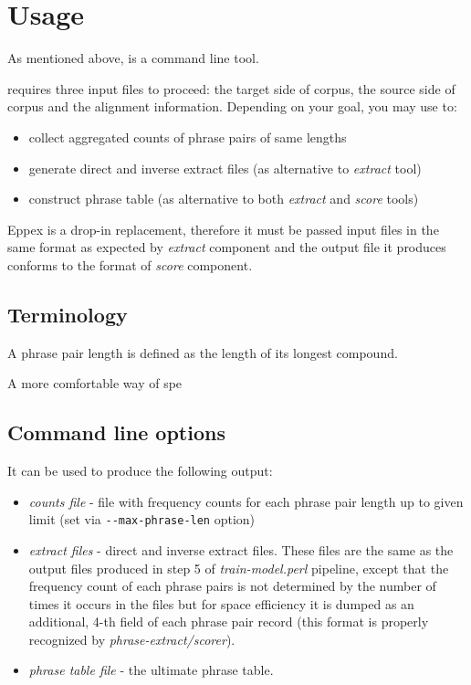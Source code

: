 

\section{Usage}

As mentioned above, \eppex{} is a command line tool.

\Eppex{} requires three input files to proceed:
the target side of corpus, the source side of corpus and the alignment information.
Depending on your goal, you may use \eppex{} to:
\begin{itemize}
 \item collect aggregated counts of phrase pairs of same lengths
 \item generate direct and inverse extract files (as alternative to \emph{extract} tool)
 \item construct phrase table (as alternative to both \emph{extract} and \emph{score} tools)
\end{itemize}

Eppex is a drop-in replacement, therefore it must be passed input files
in the same format as expected by \emph{extract} component and
the output file it produces conforms to the format of \emph{score} component.

\subsection{Terminology}


A phrase pair length is defined as the length of its longest compound.

A more comfortable way of spe

\subsection{Command line options}

It can be used to produce the following output:
\begin{itemize}
 \item \emph{counts file} - file with frequency counts for each phrase pair
  length up to given limit (set via \verb|--max-phrase-len| option)
 \item \emph{extract files} - direct and inverse extract files. These files are the
  same as the output files produced in step 5 of \emph{train-model.perl} pipeline,
  except that the frequency count of each phrase pairs is not determined by
  the number of times it occurs in the files but for space efficiency it is
  dumped as an additional, 4-th field of each phrase pair record (this format
  is properly recognized by \emph{phrase-extract/scorer}).
 \item \emph{phrase table file} - the ultimate phrase table.
\end{itemize}

